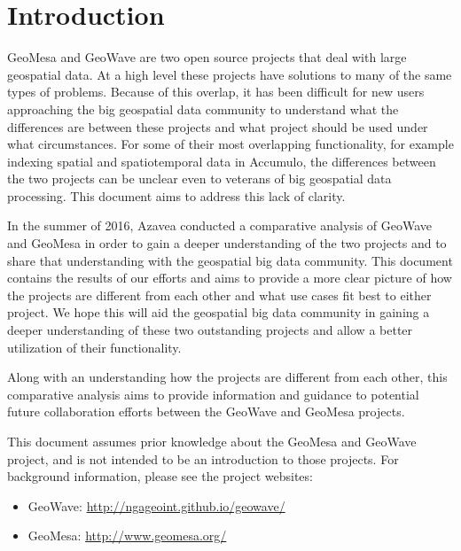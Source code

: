 \section{Introduction}
\label{sec:introduction}

GeoMesa and GeoWave are two open source projects that deal with large geospatial data.
At a high level these projects have solutions to many of the same types of problems.
Because of this overlap, it has been difficult for new users approaching the big geospatial data community to understand what the differences are between these projects and what project should be used under what circumstances.
For some of their most overlapping functionality, for example indexing spatial and spatiotemporal data in Accumulo, the differences between the two projects can be unclear even to veterans of big geospatial data processing.
This document aims to address this lack of clarity.

In the summer of 2016, Azavea conducted a comparative analysis of GeoWave and GeoMesa in order to gain a deeper understanding of the two projects and to share that understanding with the geospatial big data community.
This document contains the results of our efforts and aims to provide a more clear picture of how the projects are different from each other and what use cases fit best to either project.
We hope this will aid the geospatial big data community in gaining a deeper understanding of these two outstanding projects and allow a better utilization of their functionality.

Along with an understanding how the projects are different from each other, this comparative analysis aims to provide information and guidance to potential future collaboration efforts between the GeoWave and GeoMesa projects.

This document assumes prior knowledge about the GeoMesa and GeoWave project, and is not intended to be an introduction to those projects.
For background information, please see the project websites:


\begin{itemize}
\item  GeoWave: \url{http://ngageoint.github.io/geowave/}
\item  GeoMesa: \url{http://www.geomesa.org/}
\end{itemize}
